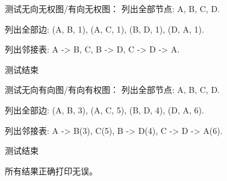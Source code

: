 \documentclass[UTF8]{ctexart}
\begin{document}
\begin{flushleft}
测试无向无权图/有向无权图：\newline
列出全部节点: A, B, C, D.\newline

列出全部边: (A, B, 1), (A, C, 1), (B, D, 1), (D, A, 1).\newline

列出邻接表:\newline
A -> B, C, \newline
B -> D, \newline
C -> \newline
D -> A. \newline

测试结束\newline

测试无向有向图/有向有权图：\newline
列出全部节点: A, B, C, D.\newline

列出全部边: (A, B, 3), (A, C, 5), (B, D, 4), (D, A, 6).\newline

列出邻接表:\newline
A -> B(3), C(5), \newline
B -> D(4), \newline
C -> \newline
D -> A(6). \newline

测试结束\newline
\end{flushleft}

所有结果正确打印无误。
\end{document}
